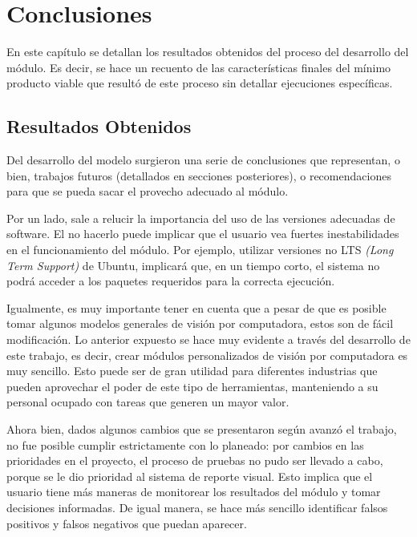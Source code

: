 
\chapter{Conclusiones} %

\label{Chapter5} %




En este capítulo se detallan los resultados obtenidos del proceso del desarrollo del módulo. Es decir, se hace un recuento de las características finales del mínimo producto viable que resultó de este proceso sin detallar ejecuciones específicas. 

\section{Resultados Obtenidos}
Del desarrollo del modelo surgieron una serie de conclusiones que representan, o bien, trabajos futuros (detallados en secciones posteriores), o recomendaciones para que se pueda sacar el provecho adecuado al módulo.
 
Por un lado, sale a relucir la importancia del uso de las versiones adecuadas de software. El no hacerlo puede implicar que el usuario vea fuertes inestabilidades en el funcionamiento del módulo. Por ejemplo, utilizar versiones no LTS \textit{(Long Term Support)} de Ubuntu, implicará que, en un tiempo corto, el sistema no podrá acceder a los paquetes requeridos para la correcta ejecución.

Igualmente, es muy importante tener en cuenta que a pesar de que es posible tomar algunos modelos generales de visión por computadora, estos son de fácil modificación. Lo anterior expuesto se hace muy evidente a través del desarrollo de este trabajo, es decir, crear módulos personalizados de visión por computadora es muy sencillo. Esto puede ser de gran utilidad para diferentes industrias que pueden aprovechar el poder de este tipo de herramientas, manteniendo a su personal ocupado con tareas que generen un mayor valor. 

Ahora bien, dados algunos cambios que se presentaron según avanzó el trabajo, no fue posible cumplir estrictamente con lo planeado: por cambios en las prioridades en el proyecto, el proceso de pruebas no pudo ser llevado a cabo, porque se le dio prioridad al sistema de reporte visual. Esto implica que el usuario tiene más maneras de monitorear los resultados del módulo y tomar decisiones informadas. De igual manera, se hace más sencillo identificar falsos positivos y falsos negativos que puedan aparecer.

